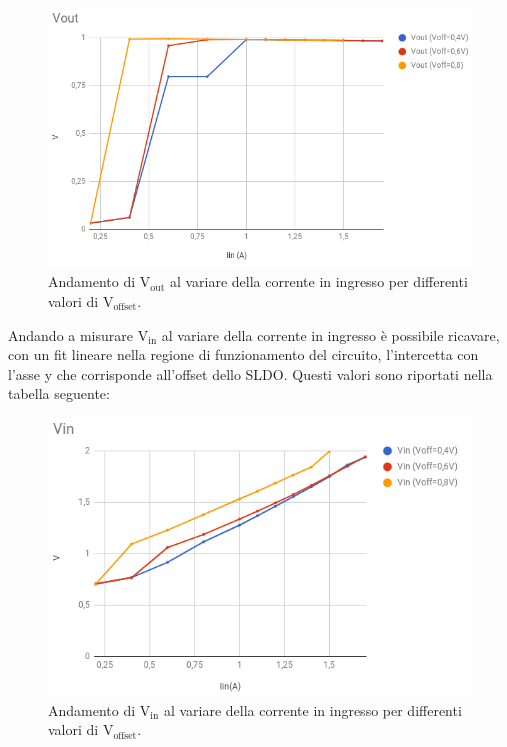 \begin{figure}
\centering
\includegraphics[scale=.4]{Immagini/VoutVsVoffset}
\caption{Andamento di $\mathrm{V_{out}}$ al variare della corrente in ingresso per differenti valori di $\mathrm{V_{offset}}$.}
\label{VoutVsVoffset}
\end{figure}

Andando a misurare $\mathrm{V_{in}}$ al variare della corrente in ingresso è possibile ricavare, con un fit lineare nella regione di funzionamento del circuito, l'intercetta con l'asse y che corrisponde all'offset dello SLDO. 
Questi valori sono riportati nella tabella seguente:

\begin{figure}
\centering
\includegraphics[scale=.4]{Immagini/VinVsVoffset}
\caption{Andamento di $\mathrm{V_{in}}$ al variare della corrente in ingresso per differenti valori di $\mathrm{V_{offset}}$.}
\label{VinVsVoffset}
\end{figure}

